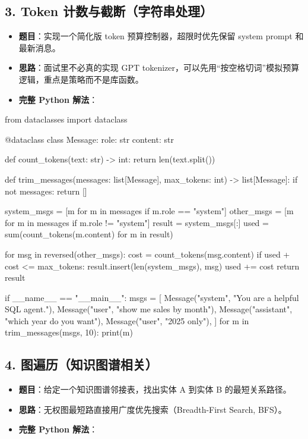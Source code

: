 \subsection{3. Token 计数与截断（字符串处理）}
\begin{itemize}[leftmargin=2em]
\item \textbf{题目}：实现一个简化版 token 预算控制器，超限时优先保留 system prompt 和最新消息。
\item \textbf{思路}：面试里不必真的实现 GPT tokenizer，可以先用``按空格切词''模拟预算逻辑，重点是策略而不是库函数。
\item \textbf{完整 Python 解法}：
\end{itemize}

\begin{codeblock}
from dataclasses import dataclass


@dataclass
class Message:
    role: str
    content: str


def count_tokens(text: str) -> int:
    return len(text.split())


def trim_messages(messages: list[Message], max_tokens: int) -> list[Message]:
    if not messages:
        return []

    system_msgs = [m for m in messages if m.role == "system"]
    other_msgs = [m for m in messages if m.role != "system"]
    result = system_msgs[:]
    used = sum(count_tokens(m.content) for m in result)

    for msg in reversed(other_msgs):
        cost = count_tokens(msg.content)
        if used + cost <= max_tokens:
            result.insert(len(system_msgs), msg)
            used += cost
    return result


if __name__ == "__main__":
    msgs = [
        Message("system", "You are a helpful SQL agent."),
        Message("user", "show me sales by month"),
        Message("assistant", "which year do you want"),
        Message("user", "2025 only"),
    ]
    for m in trim_messages(msgs, 10):
        print(m)
\end{codeblock}

\subsection{4. 图遍历（知识图谱相关）}
\begin{itemize}[leftmargin=2em]
\item \textbf{题目}：给定一个知识图谱邻接表，找出实体 A 到实体 B 的最短关系路径。
\item \textbf{思路}：无权图最短路直接用广度优先搜索（Breadth-First Search, BFS）。
\item \textbf{完整 Python 解法}：
\end{itemize}

